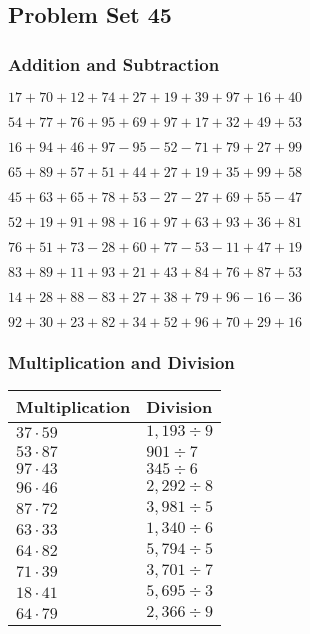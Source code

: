 \hypertarget{problem-set-45}{%
\subsection{Problem Set 45}\label{problem-set-45}}

\hypertarget{addition-and-subtraction}{%
\subsubsection{Addition and
Subtraction}\label{addition-and-subtraction}}

\(17+70+12+74+27+19+39+97+16+40\)

\(54+77+76+95+69+97+17+32+49+53\)

\(16+94+46+97-95-52-71+79+27+99\)

\(65+89+57+51+44+27+19+35+99+58\)

\(45+63+65+78+53-27-27+69+55-47\)

\(52+19+91+98+16+97+63+93+36+81\)

\(76+51+73-28+60+77-53-11+47+19\)

\(83+89+11+93+21+43+84+76+87+53\)

\(14+28+88-83+27+38+79+96-16-36\)

\(92+30+23+82+34+52+96+70+29+16\)

\hypertarget{multiplication-and-division}{%
\subsubsection{Multiplication and
Division}\label{multiplication-and-division}}

\begin{longtable}[]{@{}ll@{}}
\toprule
Multiplication & Division\tabularnewline
\midrule
\endhead
\(37\cdot59\) & \(1,193÷9\)\tabularnewline
\(53\cdot87\) & \(901÷7\)\tabularnewline
\(97\cdot43\) & \(345÷6\)\tabularnewline
\(96\cdot46\) & \(2,292÷8\)\tabularnewline
\(87\cdot72\) & \(3,981÷5\)\tabularnewline
\(63\cdot33\) & \(1,340÷6\)\tabularnewline
\(64\cdot82\) & \(5,794÷5\)\tabularnewline
\(71\cdot39\) & \(3,701÷7\)\tabularnewline
\(18\cdot41\) & \(5,695÷3\)\tabularnewline
\(64\cdot79\) & \(2,366÷9\)\tabularnewline
\bottomrule
\end{longtable}
